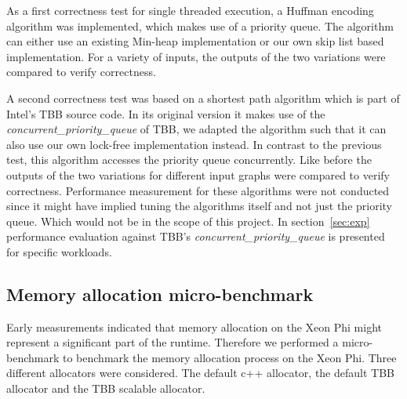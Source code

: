 As a first correctness test for single threaded execution, a Huffman encoding algorithm was implemented, which makes use of a priority queue.
The algorithm can either use an existing Min-heap implementation or our own skip list based implementation.
For a variety of inputs, the outputs of the two variations were compared to verify correctness.


A second correctness test was based on a shortest path algorithm which is part of Intel's TBB source code.
In its original version it makes use of the \textit{concurrent\_priority\_queue} of TBB, we adapted the algorithm such that it can also use our own lock-free implementation instead. In contrast to the previous test, this algorithm accesses the priority queue concurrently. Like before the outputs of the two variations for different input graphs were compared to verify correctness. Performance measurement for these algorithms were not conducted since it might have implied tuning the algorithms itself and not just the priority queue. Which would not be in the scope of this project. In section~\ref{sec:exp} performance evaluation against TBB's \textit{concurrent\_priority\_queue} is presented for specific workloads.

\subsection{Memory allocation micro-benchmark}
Early measurements indicated that memory allocation on the Xeon Phi might represent a significant part of the runtime. Therefore we performed a micro-benchmark to benchmark the memory allocation process on the Xeon Phi. Three different allocators were considered. The default c++ allocator, the default TBB allocator and the TBB scalable allocator. 

